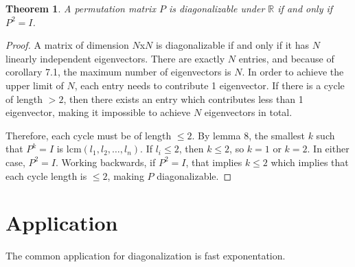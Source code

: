 \documentclass[11pt, oneside]{article}
\theoremstyle{plain}
\newtheorem{theorem}{Theorem}[section]
\theoremstyle{definition}
\begin{document}
\begin{theorem}
A permutation matrix \( P \) is diagonalizable under \( \mathbb{R} \) if and only if \( P^2 = I \).
\end{theorem}

\begin{proof}
A matrix of dimension \( N \)x\( N \) is diagonalizable if and only if it has \( N \)
linearly independent eigenvectors. There are exactly \( N \) entries,
and because of corollary 7.1, the maximum number of eigenvectors is \( N \).
In order to achieve the upper limit of \( N \), each entry needs to contribute
1 eigenvector. If there is a cycle of length \( > 2 \), then there exists an
entry which contributes less than 1 eigenvector, making it impossible to
achieve \( N \) eigenvectors in total.

Therefore, each cycle must be of length \( \leq 2 \). By lemma 8,
the smallest \( k \) such that \( P^k = I \) is \( \mathrm{lcm }(l_1, l_2, \ldots, l_n) \).
If \( l_i \leq 2 \), then \( k \leq 2 \), so \( k = 1 \) or
\( k = 2 \). In either case, \( P^2 = I \). Working backwards, if
\( P^2 = I \), that implies \( k \leq 2 \) which implies that each cycle
length is \( \leq 2 \), making \( P \) diagonalizable.
\end{proof}

\section{Application}
The common application for diagonalization is fast exponentation.
\end{document}
